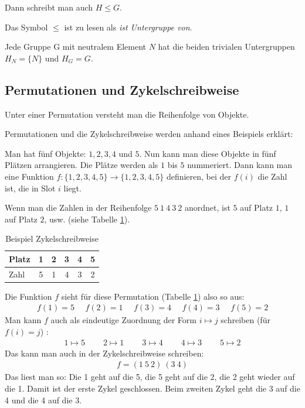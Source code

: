 \documentclass[12pt,a4paper, usenames, dvipsnames]{article}
\begin{document}
Dann schreibt man auch $H \leqslant G$. 



Das Symbol $\leqslant$ ist zu lesen als \textit{ist Untergruppe von}. 


Jede Gruppe G mit neutralem Element $N$ hat die beiden trivialen Untergruppen ${H_N = \{N\}}$ und $H_G=G$.
%
%
%
%
%
%
%
%
%
%
\subsection*{Permutationen und Zykelschreibweise} 
\label{11}
Unter einer Permutation versteht man die Reihenfolge von Objekte.

Permutationen und die Zykelschreibweise werden anhand eines Beispiels erklärt: 

Man hat fünf Objekte: $1, 2, 3, 4$ und $5$. Nun kann man diese Objekte in fünf Plätzen arrangieren. Die Plätze werden als $1$ bis $5$ nummeriert. Dann kann man eine Funktion $f:\{1,2,3,4,5\} \rightarrow \{1,2,3,4,5\}$ definieren, bei der $f(i)$ die Zahl ist, die in Slot $i$ liegt.

Wenn man die Zahlen in der Reihenfolge $5 \ 1\ 4\ 3 \ 2$ anordnet, ist $5$ auf Platz $1$, $1$ auf Platz $2$, usw. (siehe Tabelle \ref{9}). 

\begin{table}[h]
\centering
\begin{tabular}{l|ccccc}
Platz & 1 & 2 & 3 & 4 & 5 \\
\hline
Zahl & 5 & 1 & 4 & 3 & 2 \\
\end{tabular}
\caption{Beispiel Zykelschreibweise}
\label{9}
\end{table}
Die Funktion $f$ sieht für diese Permutation (Tabelle \ref{9}) also so aus:
\begin{align*}
f(1) = 5 \ \ \ \ \ \  f(2) = 1 \ \ \ \ \ \ f(3) = 4 \ \ \ \ \ \ f(4) = 3 \ \ \ \ \ \ f(5) = 2 
\end{align*}
Man kann $f$ auch als eindeutige Zuordnung der Form $i \mapsto j$ schreiben (für $f(i)=j$) \cite{JC}:
\begin{align*}
1 \mapsto 5 \ \ \ \ \ \ \ \ \ \  2\mapsto 1 \ \ \ \ \ \ \ \ \ \ 3\mapsto 4 \ \ \ \ \ \ \ \ \ \ 4\mapsto 3 \ \ \ \ \ \ \ \ \ \ 5\mapsto 2 
\end{align*}
Das kann man auch in der Zykelschreibweise schreiben:
\begin{align*}
f = (1 \ 5 \ 2)\ (3 \ 4)
\end{align*}
Das liest man so: Die 1 geht auf die 5, die 5 geht auf die 2, die 2 geht wieder auf die 1. Damit ist der erste Zykel geschlossen. Beim zweiten Zykel geht die 3 auf die 4 und die 4 auf die 3.
\end{document}

